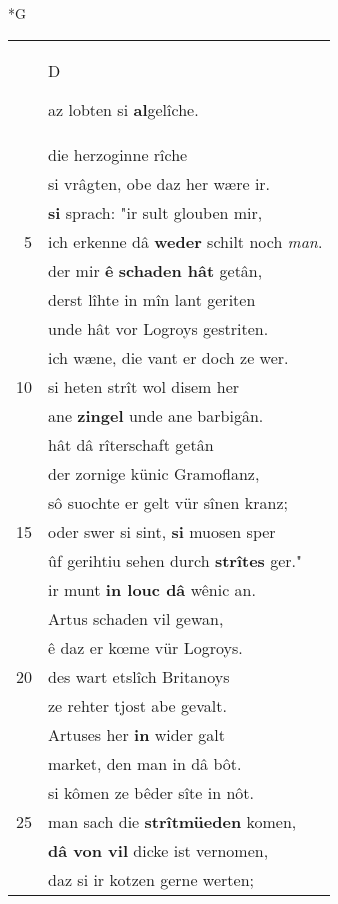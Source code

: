 \documentclass[8pt,a4paper,notitlepage]{article}
\begin{document}
\newpage
\begin{table}[ht]
\begin{minipage}[t]{0.5\linewidth}
\small
\begin{center}*G
\end{center}
\begin{tabular}{rl}
 & \begin{large}D\end{large}az lobten si \textbf{al}gelîche.\\ 
 & die herzoginne rîche\\ 
 & si vrâgten, obe daz her wære ir.\\ 
 & \textbf{si} sprach: "ir sult glouben mir,\\ 
5 & ich erkenne dâ \textbf{weder} schilt noch \textit{man}.\\ 
 & der mir \textbf{ê} \textbf{schaden hât} getân,\\ 
 & derst lîhte in mîn lant geriten\\ 
 & unde hât vor Logroys gestriten.\\ 
 & ich wæne, die vant er doch ze wer.\\ 
10 & si heten strît wol disem her\\ 
 & ane \textbf{zingel} unde ane barbigân.\\ 
 & hât dâ rîterschaft getân\\ 
 & der zornige künic Gramoflanz,\\ 
 & sô suochte er gelt vür sînen kranz;\\ 
15 & oder swer si sint, \textbf{si} muosen sper\\ 
 & ûf gerihtiu sehen durch \textbf{strîtes} ger."\\ 
 & ir munt \textbf{in louc dâ} wênic an.\\ 
 & Artus schaden vil gewan,\\ 
 & ê daz er kœme vür Logroys.\\ 
20 & des wart etslîch Britanoys\\ 
 & ze rehter tjost abe gevalt.\\ 
 & Artuses her \textbf{in} wider galt\\ 
 & market, den man in dâ bôt.\\ 
 & si kômen ze bêder sîte in nôt.\\ 
25 & man sach die \textbf{strîtmüeden} komen,\\ 
 & \textbf{dâ von vil} dicke ist vernomen,\\ 
 & daz si ir kotzen gerne werten;\\ 

\end{tabular}
\end{minipage}
\end{table}
\end{document}
